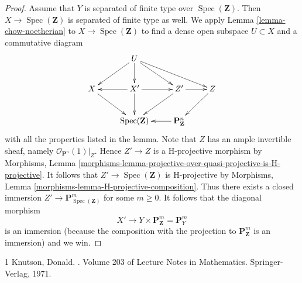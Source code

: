 \documentclass[10pt,a4paper]{amsart}
\theoremstyle{plain}
\theoremstyle{definition}
\theoremstyle{remark}
\numberwithin{equation}{subsection}
\def\Spec{\mathop{\mathrm{Spec}}}
\begin{document}
\begin{proof}
\medskip\noindent
Assume that $Y$ is separated of finite type over $\Spec(\mathbf{Z})$.
Then $X \to \Spec(\mathbf{Z})$ is separated of finite type as well.
We apply Lemma \ref{lemma-chow-noetherian} to $X \to \Spec(\mathbf{Z})$
to find a dense open subspace $U \subset X$ and a commutative diagram
$$
\xymatrix{
& U \ar[ld] \ar[d] \ar[rd] \ar[rrd] \\
X \ar[rd] & X' \ar[l] \ar[d] \ar[r] & Z' \ar[ld] \ar[r] & Z \ar[ld] \\
& \Spec(\mathbf{Z}) & \mathbf{P}^n_\mathbf{Z} \ar[l]
}
$$
with all the properties listed in the lemma.
Note that $Z$ has an ample invertible sheaf, namely
$\mathcal{O}_{\mathbf{P}^n}(1)|_Z$. Hence $Z' \to Z$
is a H-projective morphism by Morphisms, Lemma
\ref{morphisms-lemma-projective-over-quasi-projective-is-H-projective}.
It follows that $Z' \to \Spec(\mathbf{Z})$ is H-projective
by Morphisms, Lemma \ref{morphisms-lemma-H-projective-composition}.
Thus there exists a closed immersion
$Z' \to \mathbf{P}^m_{\Spec(\mathbf{Z})}$ for some $m \geq 0$.
It follows that the diagonal morphism
$$
X' \to Y \times \mathbf{P}^m_\mathbf{Z} = \mathbf{P}^m_Y
$$
is an immersion (because the composition with the projection
to $\mathbf{P}^m_\mathbf{Z}$ is an immersion) and we win.
\end{proof}

\begin{thebibliography}{1}
Knutson, Donald.
.
\newblock Volume 203 of Lecture Notes in Mathematics. Springer-Verlag, 1971.
\end{thebibliography}
\end{document}
